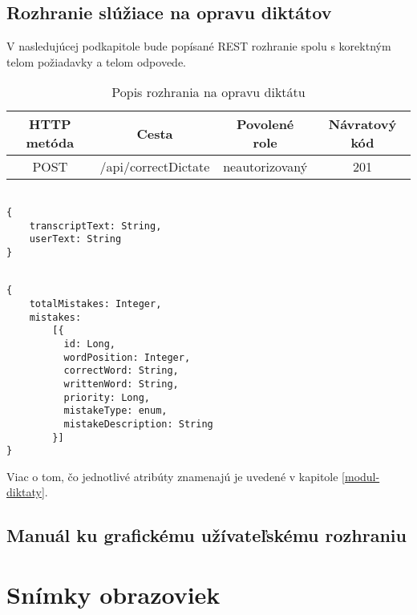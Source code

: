 \documentclass[12pt,oneside]{fithesis2}
\begin{document}
      \section{Rozhranie slúžiace na opravu diktátov} \label{navod_oprava}
      \par V nasledujúcej podkapitole bude popísané REST rozhranie spolu s korektným telom požiadavky a telom odpovede.
\begin{table}[htbp]
\centering
\begin{tabular}{@{}|c|c|c|c|@{}}
\hline
\textbf{HTTP metóda} & \textbf{Cesta} & \textbf{Povolené role} & \textbf{Návratový kód}  \\ \hline
           POST     &  /api/correctDictate         &     neautorizovaný       &    201        \\ \hline
\end{tabular}
\caption{Popis rozhrania na opravu diktátu}
\label{rozhranie-oprava}
\end{table}
\lstset{language=Java}          %
\begin{lstlisting}[frame=single]  % Start your code-block

{ 
	transcriptText: String,
	userText: String
}
\end{lstlisting}
\bigskip
\lstset{language=Java}          %
\begin{lstlisting}[frame=single]  % Start your code-block

{ 
	totalMistakes: Integer,
	mistakes: 
		[{ 
		  id: Long,
		  wordPosition: Integer,
		  correctWord: String,
		  writtenWord: String,
		  priority: Long,
		  mistakeType: enum,
		  mistakeDescription: String 	
		}]	
}
\end{lstlisting}
\bigskip
\par Viac o tom, čo jednotlivé atribúty znamenajú je uvedené v kapitole \ref{modul-diktaty}.




      \section{Manuál ku grafickému užívateľskému rozhraniu}
    \chapter{Snímky obrazoviek}
\end{document}
